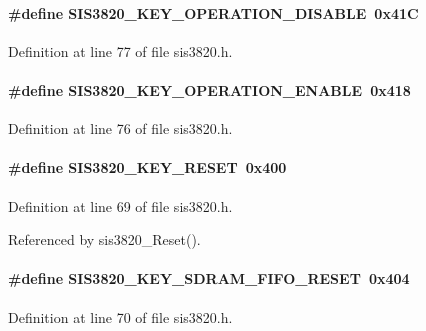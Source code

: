 \paragraph[{SIS3820\_\-KEY\_\-OPERATION\_\-DISABLE}]{\setlength{\rightskip}{0pt plus 5cm}\#define SIS3820\_\-KEY\_\-OPERATION\_\-DISABLE~0x41C}\hfill\label{sis3820_8h_a7b761ea554ac533348d5cf5f807c2c36}


Definition at line 77 of file sis3820.h.
\paragraph[{SIS3820\_\-KEY\_\-OPERATION\_\-ENABLE}]{\setlength{\rightskip}{0pt plus 5cm}\#define SIS3820\_\-KEY\_\-OPERATION\_\-ENABLE~0x418}\hfill\label{sis3820_8h_a47bd5f82daa7a059328cacdd859a48b1}


Definition at line 76 of file sis3820.h.
\paragraph[{SIS3820\_\-KEY\_\-RESET}]{\setlength{\rightskip}{0pt plus 5cm}\#define SIS3820\_\-KEY\_\-RESET~0x400}\hfill\label{sis3820_8h_adceab89049353ec0693f78f0d862134e}


Definition at line 69 of file sis3820.h.

Referenced by sis3820\_\-Reset().
\paragraph[{SIS3820\_\-KEY\_\-SDRAM\_\-FIFO\_\-RESET}]{\setlength{\rightskip}{0pt plus 5cm}\#define SIS3820\_\-KEY\_\-SDRAM\_\-FIFO\_\-RESET~0x404}\hfill\label{sis3820_8h_ad9b3a5ff697244d2e371af3546546b15}


Definition at line 70 of file sis3820.h.
